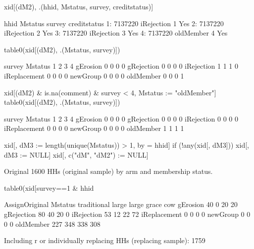 \begin{Schunk}
\begin{Sinput}
xid[(dM2), .(hhid, Mstatus, survey, creditstatus)]
\end{Sinput}
\begin{Soutput}
      hhid    Mstatus survey creditstatus
1: 7137220 iRejection      1          Yes
2: 7137220 iRejection      2          Yes
3: 7137220 iRejection      3          Yes
4: 7137220  oldMember      4          Yes
\end{Soutput}
\begin{Sinput}
table0(xid[(dM2), .(Mstatus, survey)])
\end{Sinput}
\begin{Soutput}
              survey
Mstatus        1 2 3 4
  gErosion     0 0 0 0
  gRejection   0 0 0 0
  iRejection   1 1 1 0
  iReplacement 0 0 0 0
  newGroup     0 0 0 0
  oldMember    0 0 0 1
\end{Soutput}
\begin{Sinput}
xid[(dM2) & is.na(comment) & survey < 4, Mstatus := "oldMember"]
table0(xid[(dM2), .(Mstatus, survey)])
\end{Sinput}
\begin{Soutput}
              survey
Mstatus        1 2 3 4
  gErosion     0 0 0 0
  gRejection   0 0 0 0
  iRejection   0 0 0 0
  iReplacement 0 0 0 0
  newGroup     0 0 0 0
  oldMember    1 1 1 1
\end{Soutput}
\begin{Sinput}
xid[, dM3 := length(unique(Mstatus)) > 1, by = hhid]
if (!any(xid[, dM3])) xid[, dM3 := NULL]
xid[, c("dM", "dM2") := NULL]
\end{Sinput}
\end{Schunk}
Original 1600 HHs (original sample) by arm and membership status.
\begin{Schunk}
\begin{Sinput}
table0(xid[survey==1 & hhid %in% hhido, .(Mstatus, AssignOriginal)])
\end{Sinput}
\begin{Soutput}
              AssignOriginal
Mstatus        traditional large large grace cow
  gErosion              40     0          20  20
  gRejection            80    40          20   0
  iRejection            53    12          22  72
  iReplacement           0     0           0   0
  newGroup               0     0           0   0
  oldMember            227   348         338 308
\end{Soutput}
\end{Schunk}
Including \textsf{r} or individually replacing HHs (replacing sample): 1759
